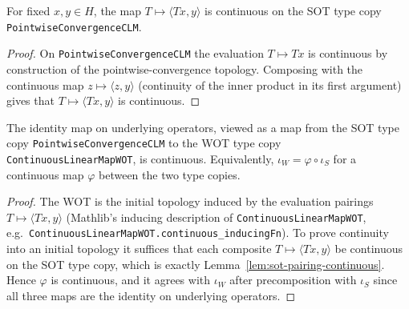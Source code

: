 \begin{lemma}
    \label{lem:sot-pairing-continuous}
    \leanok
    For fixed $x, y \in H$, the map $T \mapsto \langle T x, y\rangle$ is
    continuous on the SOT type copy \texttt{PointwiseConvergenceCLM}.
\end{lemma}
\begin{proof}
    On \texttt{PointwiseConvergenceCLM} the evaluation $T \mapsto T x$ is
    continuous by construction of the pointwise-convergence topology. Composing
    with the continuous map $z \mapsto \langle z, y\rangle$ (continuity of the
    inner product in its first argument) gives that
    $T \mapsto \langle T x, y\rangle$ is continuous.
\end{proof}

\begin{lemma}
    \label{lem:continuous-sot-wot}
    \leanok
    The identity map on underlying operators, viewed as a map from the SOT type
    copy \texttt{PointwiseConvergenceCLM} to the WOT type copy
    \texttt{ContinuousLinearMapWOT}, is continuous. Equivalently,
    $\iota_W = \varphi \circ \iota_S$ for a continuous map
    $\varphi$ between the two type copies.
\end{lemma}
\begin{proof}
    The WOT is the initial topology induced by the evaluation pairings
    $T \mapsto \langle T x, y\rangle$ (Mathlib's inducing description of
    \texttt{ContinuousLinearMapWOT}, e.g.\
    \texttt{ContinuousLinearMapWOT.continuous\_inducingFn}). To prove continuity
    into an initial topology it suffices that each composite
    $T \mapsto \langle T x, y\rangle$ be continuous on the SOT type copy, which is
    exactly Lemma~\ref{lem:sot-pairing-continuous}. Hence $\varphi$ is continuous,
    and it agrees with $\iota_W$ after precomposition with $\iota_S$ since all
    three maps are the identity on underlying operators.
\end{proof}

